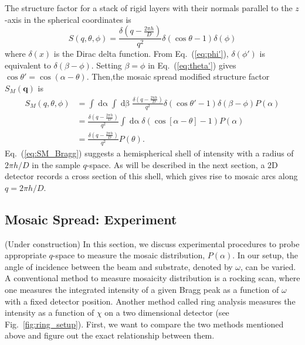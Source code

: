 The structure factor for a stack of rigid layers with their normals parallel
to the $z$-axis in the spherical coordinates is
\begin{equation}
  S(q,\theta,\phi) = \frac{\delta(q-\frac{2\pi h}{D})}{q^2} 
  \delta(\cos\theta-1) \delta(\phi)
  \label{eq:Bragg_spherical}
\end{equation}
where $\delta(x)$ is the Dirac delta function. 
From Eq.~(\ref{eq:phi'}), $\delta(\phi')$ is equivalent to
$\delta(\beta-\phi)$. Setting $\beta=\phi$ in Eq.~(\ref{eq:theta'}) gives
$\cos\theta'=\cos(\alpha-\theta)$. 
Then,the mosaic spread modified structure factor $S_M(\mathbf{q})$ is
\begin{align}
  S_M(q,\theta,\phi) &= \int\mathop{d\alpha}\int\mathop{d\beta}
  \frac{\delta(q-\frac{2\pi h}{D})}{q^2} \delta(\cos\theta'-1) \delta(\beta-\phi)P(\alpha) \nonumber\\
  &= \frac{\delta(q-\frac{2\pi h}{D})}{q^2} \int\mathop{d\alpha} \delta(\cos[\alpha-\theta]-1)P(\alpha)\nonumber\\
  &= \frac{\delta(q-\frac{2\pi h}{D})}{q^2}P(\theta).
  \label{eq:SM_Bragg}
\end{align}
Eq.~(\ref{eq:SM_Bragg}) suggests a hemispherical shell of intensity with
a radius of $2\pi h/D$ in the sample $q$-space. As will be described
in the next section, a 2D detector records a cross section of this shell,
which gives rise to mosaic arcs along $q=2\pi h/D$. 

\subsection{Mosaic Spread: Experiment}
(Under construction)
In this section, we discuss experimental procedures to probe appropriate 
$q$-space
to measure the mosaic distribution, $P(\alpha)$. In our setup, the angle of 
incidence between the beam and substrate, denoted by $\omega$, can be varied. A 
conventional method to measure mosaicity distribution is a rocking scan, where
one measures the integrated intensity of a given Bragg peak as a function of 
$\omega$ with a fixed detector position. Another method called
ring analysis measures the intensity as a function of $\chi$ on a two
dimensional detector (see Fig.~\ref{fig:ring_setup}). 
First, we want to compare the two methods mentioned 
above and figure out the exact relationship between them.

